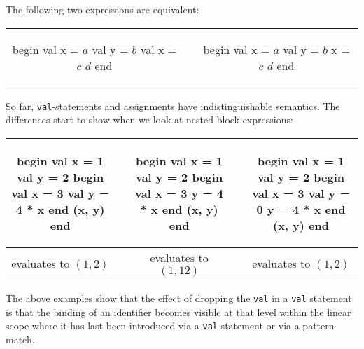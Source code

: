 \documentclass[11pt]{amsart}
\newcommand{\babelsrc}[1] {\lstinline!#1!}
\begin{document}
The following two expressions are equivalent:
\begin{center}
\begin{tabular}{ccc}
\begin{babellisting}
begin
  val x = $a$ 
  val y = $b$
  val x = $c$
  $d$
end
\end{babellisting}
& \hspace{2cm} &
\begin{babellisting}
begin
  val x = $a$ 
  val y = $b$
  x = $c$
  $d$
end
\end{babellisting}
\end{tabular}
\end{center}
So far, \babelsrc{val}-statements and assignments have indistinguishable semantics. The differences start to show when we look at nested block expressions:
\begin{center}
\begin{tabular}{ccccc}
\begin{babellisting}
begin
  val x = 1 
  val y = 2
  begin
    val x = 3
    val y = 4 * x
  end
  (x, y)
end
\end{babellisting}
& \hspace{1cm} &
\begin{babellisting}
begin
  val x = 1 
  val y = 2
  begin
    val x = 3
    y = 4 * x
  end
  (x, y)
end
\end{babellisting}
& \hspace{1cm} &
\begin{babellisting}
begin
  val x = 1 
  val y = 2
  begin
    val x = 3
    val y = 0
    y = 4 * x
  end
  (x, y)
end
\end{babellisting}\\\hline
evaluates to $(1, 2)$ & &
evaluates to $(1, 12)$ & &
evaluates to $(1, 2)$ \\[0.5cm]
\end{tabular}
\end{center}
The above examples show that the effect of dropping the \babelsrc{val} in a \babelsrc{val} statement is that the binding of an identifier becomes visible at that level within the linear scope where it has last been introduced via a \babelsrc{val} statement or via a pattern match.
\end{document}
